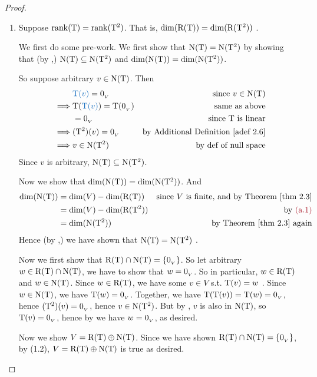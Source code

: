 \begin{proof} \ 

\begin{enumerate}
\item Suppose \(\mathrm{rank}(\mathrm{T}) = \mathrm{rank}(\mathrm{T}^2)\).
That is, \(\dim(\mathrm{R(T)}) = \dim(\mathrm{R}(\mathrm{T}^2))\) .

We first do some pre-work.
We first show that \(\mathrm{N(T)} = \mathrm{N}(\mathrm{T}^2)\) by showing that (by ,) \(\mathrm{N(T)} \subseteq \mathrm{N}(\mathrm{T}^2)\) and \(\dim(\mathrm{N(T)}) = \dim(\mathrm{N}(\mathrm{T}^2))\).

So suppose arbitrary \(v \in \mathrm{N(T)}\).
Then
\begin{align*}
             & \BLUE{\T(v)} = \OV & \text{since \(v \in \NULLT\)} \\
    \implies & \T(\BLUE{\T(v)}) = \T(\OV) & \text{same as above} \\
             & = \OV & \text{since \(\T\) is linear} \\
    \implies & (\T^2)(v) = \OV & \text{by \ADEF{2.6}} \\
    \implies & v \in \NULL(\T^2) & \text{by def of null space}
\end{align*}
Since \(v\) is arbitrary, \(\mathrm{N(T)} \subseteq \mathrm{N}(\mathrm{T}^2)\).

Now we show that \(\dim(\mathrm{N(T)}) = \dim(\mathrm{N}(\mathrm{T}^2))\).
And
\begin{align*}
    \dim(\NULLT) & = \dim(V) - \dim(\RANGET) & \text{since \(V\) is finite, and by \THM{2.3}} \\
                 & = \dim(V) - \dim(\RANGE(\T^2)) & \text{by \MAROON{(a.1)}} \\
                 & = \dim(\NULL(\T^2)) & \text{by \THM{2.3} again}
\end{align*}
Hence (by ,) we have shown that \(\mathrm{N(T)} = \mathrm{N}(\mathrm{T}^2)\) .

Now we first show that \(\mathrm{R(T)} \cap \mathrm{N(T)} = \{ 0_{_V} \}\).
So let arbitrary \(w \in \mathrm{R(T)} \cap \mathrm{N(T)}\), we have to show that \(w = 0_{_V}\).
So in particular, \(w \in \mathrm{R(T)}\) and \(w \in \mathrm{N(T)}\).
Since \(w \in \mathrm{R(T)}\), we have some \(v \in V\) s.t. \(\mathrm{T}(v) = w\) .
Since \(w \in \mathrm{N(T)}\), we have \(\mathrm{T}(w) = 0_{_V}\).
Together, we have \(\mathrm{T}(\mathrm{T}(v)) = \mathrm{T}(w) = 0_{_V}\), hence \((\mathrm{T}^2)(v) = 0_{_V}\), hence \(v \in \mathrm{N}(\mathrm{T}^2)\).
But by , \(v\) is also in \(\mathrm{N(T)}\), so \(\mathrm{T}(v) = 0_{_V}\), hence by  we have \(w = 0_{_V}\), as desired.

Now we show \(V = \mathrm{R(T)} \oplus \mathrm{N(T)}\).
Since we have shown \(\mathrm{R(T)} \cap \mathrm{N(T)} = \{ 0_{_V} \}\), by (1.2), \(V = \mathrm{R(T)} \oplus \mathrm{N(T)}\) is true as desired.


\end{enumerate}
\end{proof}
